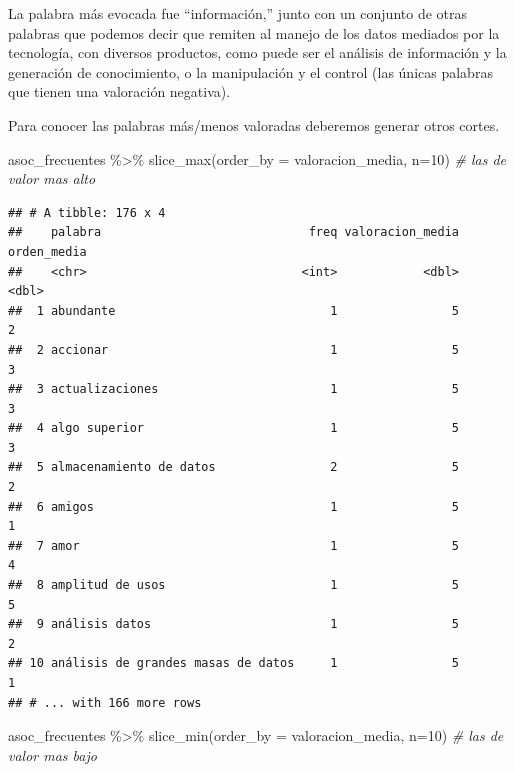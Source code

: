 \documentclass[
]{book}
\newenvironment{Shaded}{\begin{snugshade}}{\end{snugshade}}
\newcommand{\AttributeTok}[1]{\textcolor[rgb]{0.77,0.63,0.00}{#1}}
\newcommand{\CommentTok}[1]{\textcolor[rgb]{0.56,0.35,0.01}{\textit{#1}}}
\newcommand{\DecValTok}[1]{\textcolor[rgb]{0.00,0.00,0.81}{#1}}
\newcommand{\FunctionTok}[1]{\textcolor[rgb]{0.00,0.00,0.00}{#1}}
\newcommand{\NormalTok}[1]{#1}
\newcommand{\SpecialCharTok}[1]{\textcolor[rgb]{0.00,0.00,0.00}{#1}}
\begin{document}
La palabra más evocada fue ``información,'' junto con un conjunto de otras palabras que podemos decir que remiten al manejo de los datos mediados por la tecnología, con diversos productos, como puede ser el análisis de información y la generación de conocimiento, o la manipulación y el control (las únicas palabras que tienen una valoración negativa).

Para conocer las palabras más/menos valoradas deberemos generar otros cortes.

\begin{Shaded}
\begin{Highlighting}[]
\NormalTok{asoc\_frecuentes }\SpecialCharTok{\%\textgreater{}\%}  
  \FunctionTok{slice\_max}\NormalTok{(}\AttributeTok{order\_by =}\NormalTok{ valoracion\_media, }\AttributeTok{n=}\DecValTok{10}\NormalTok{) }\CommentTok{\# las de valor mas alto}
\end{Highlighting}
\end{Shaded}

\begin{verbatim}
## # A tibble: 176 x 4
##    palabra                             freq valoracion_media orden_media
##    <chr>                              <int>            <dbl>       <dbl>
##  1 abundante                              1                5           2
##  2 accionar                               1                5           3
##  3 actualizaciones                        1                5           3
##  4 algo superior                          1                5           3
##  5 almacenamiento de datos                2                5           2
##  6 amigos                                 1                5           1
##  7 amor                                   1                5           4
##  8 amplitud de usos                       1                5           5
##  9 análisis datos                         1                5           2
## 10 análisis de grandes masas de datos     1                5           1
## # ... with 166 more rows
\end{verbatim}

\begin{Shaded}
\begin{Highlighting}[]
\NormalTok{asoc\_frecuentes }\SpecialCharTok{\%\textgreater{}\%}  
  \FunctionTok{slice\_min}\NormalTok{(}\AttributeTok{order\_by =}\NormalTok{ valoracion\_media, }\AttributeTok{n=}\DecValTok{10}\NormalTok{) }\CommentTok{\# las de valor mas bajo}
\end{Highlighting}
\end{Shaded}
\end{document}
